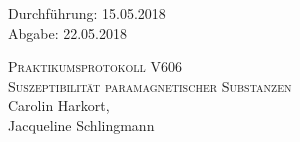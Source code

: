 

\begin{titlepage}
  \begin{flushleft}
 Durchführung: 15.05.2018\\
 Abgabe: 22.05.2018
  \end{flushleft}



 \begin{center}


\textsc{\LARGE Praktikumsprotokoll V606}\\[1.5cm]
\textsc{\huge Suszeptibilität paramagnetischer Substanzen} \\[5,5cm]

Carolin Harkort\footnotemark[1], \\
Jacqueline Schlingmann\footnotemark[2] \\[1,0cm]



 \end{center}

 \vfill

\end{titlepage}


  
  

\nocite{*}
\printbibliography

